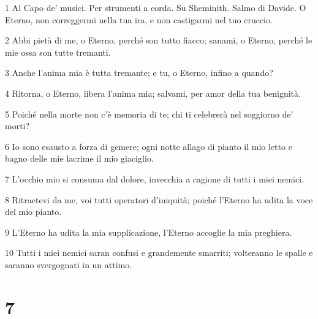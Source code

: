 \par 1 Al Capo de' musici. Per strumenti a corda. Su Sheminith. Salmo di Davide. O Eterno, non correggermi nella tua ira, e non castigarmi nel tuo cruccio.
\par 2 Abbi pietà di me, o Eterno, perché son tutto fiacco; sanami, o Eterno, perché le mie ossa son tutte tremanti.
\par 3 Anche l'anima mia è tutta tremante; e tu, o Eterno, infino a quando?
\par 4 Ritorna, o Eterno, libera l'anima mia; salvami, per amor della tua benignità.
\par 5 Poiché nella morte non c'è memoria di te; chi ti celebrerà nel soggiorno de' morti?
\par 6 Io sono esausto a forza di gemere; ogni notte allago di pianto il mio letto e bagno delle mie lacrime il mio giaciglio.
\par 7 L'occhio mio si consuma dal dolore, invecchia a cagione di tutti i miei nemici.
\par 8 Ritraetevi da me, voi tutti operatori d'iniquità; poiché l'Eterno ha udita la voce del mio pianto.
\par 9 L'Eterno ha udita la mia supplicazione, l'Eterno accoglie la mia preghiera.
\par 10 Tutti i miei nemici saran confusi e grandemente smarriti; volteranno le spalle e saranno svergognati in un attimo.

\chapter{7}

